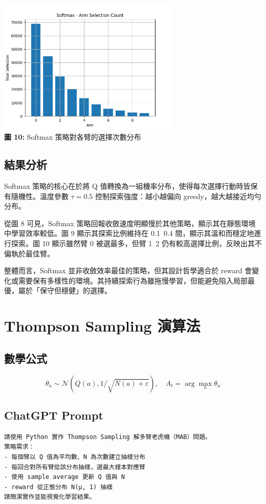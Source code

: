 \documentclass{article}
\begin{document}
\begin{center}
\includegraphics[width=0.65\textwidth]{./plots/softmax_armcount.png} \\
\textbf{圖 10:} Softmax 策略對各臂的選擇次數分布
\end{center}

\subsection*{結果分析}
Softmax 策略的核心在於將 Q 值轉換為一組機率分布，使得每次選擇行動時皆保有隨機性。溫度參數 \( \tau = 0.5 \) 控制探索強度：越小越偏向 greedy，越大越接近均勻分布。

從圖 8 可見，Softmax 策略回報收斂速度明顯慢於其他策略，顯示其在靜態環境中學習效率較低。圖 9 顯示其探索比例維持在 0.1~0.4 間，顯示其溫和而穩定地進行探索。圖 10 顯示雖然臂 0 被選最多，但臂 1~2 仍有較高選擇比例，反映出其不偏執於最佳臂。

整體而言，Softmax 並非收斂效率最佳的策略，但其設計哲學適合於 reward 會變化或需要保有多樣性的環境。其持續探索行為雖拖慢學習，但能避免陷入局部最優，屬於「保守但穩健」的選擇。

\newpage

\section{Thompson Sampling 演算法}

\subsection*{數學公式}
\begin{equation*}
\theta_a \sim \mathcal{N}(Q(a), 1/\sqrt{N(a) + \varepsilon}), \quad A_t = \arg\max_a \theta_a
\end{equation*}

\subsection*{ChatGPT Prompt}
\begin{verbatim}
請使用 Python 實作 Thompson Sampling 解多臂老虎機（MAB）問題。
策略需求：
- 每個臂以 Q 值為平均數、N 為次數建立抽樣分布
- 每回合對所有臂從該分布抽樣，選最大樣本對應臂
- 使用 sample average 更新 Q 值與 N
- reward 從正態分布 N(μ, 1) 抽樣
請簡潔實作並能視覺化學習結果。

\end{verbatim}
\end{document}

